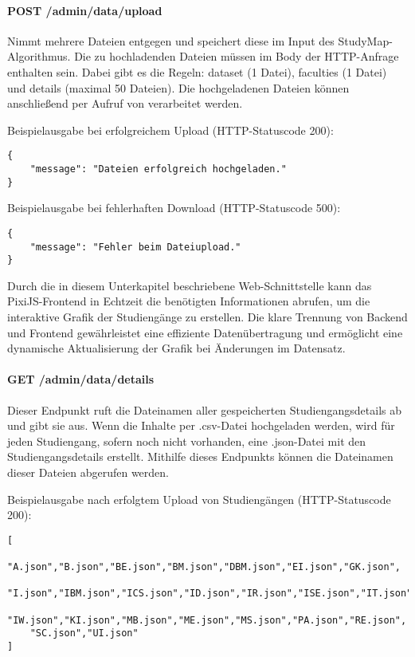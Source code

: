 \paragraph*{POST /admin/data/upload}
\vspace{-1.0em}
Nimmt mehrere Dateien entgegen und speichert diese im Input des StudyMap-Algorithmus. Die zu hochladenden Dateien müssen im Body der HTTP-Anfrage enthalten sein. Dabei gibt es die Regeln: dataset (1 Datei), faculties (1 Datei) und details (maximal 50 Dateien). Die hochgeladenen Dateien können anschließend per Aufruf von  verarbeitet werden.

\noindent
Beispielausgabe bei erfolgreichem Upload (HTTP-Statuscode 200):
\begin{lstlisting}[style=Python]
{
    "message": "Dateien erfolgreich hochgeladen."
}
\end{lstlisting}

\noindent
Beispielausgabe bei fehlerhaften Download (HTTP-Statuscode 500):
\begin{lstlisting}[style=Python]
{
    "message": "Fehler beim Dateiupload."
}
\end{lstlisting}

Durch die in diesem Unterkapitel beschriebene Web-Schnittstelle kann das PixiJS-Frontend in Echtzeit die benötigten Informationen abrufen, um die interaktive Grafik der Studiengänge zu erstellen. Die klare Trennung von Backend und Frontend gewährleistet eine effiziente Datenübertragung und ermöglicht eine dynamische Aktualisierung der Grafik bei Änderungen im Datensatz.

\paragraph*{GET /admin/data/details}
\vspace{-1.0em}
Dieser Endpunkt ruft die Dateinamen aller gespeicherten Studiengangsdetails ab und gibt sie aus. Wenn die Inhalte per .csv-Datei hochgeladen werden, wird für jeden Studiengang, sofern noch nicht vorhanden, eine .json-Datei mit den Studiengangsdetails erstellt. Mithilfe dieses Endpunkts können die Dateinamen dieser Dateien abgerufen werden.

\noindent
Beispielausgabe nach erfolgtem Upload von Studiengängen (HTTP-Statuscode 200):
\begin{lstlisting}[style=Python]
[
    "A.json","B.json","BE.json","BM.json","DBM.json","EI.json","GK.json",
    "I.json","IBM.json","ICS.json","ID.json","IR.json","ISE.json","IT.json",
    "IW.json","KI.json","MB.json","ME.json","MS.json","PA.json","RE.json",
    "SC.json","UI.json"
]
\end{lstlisting}

